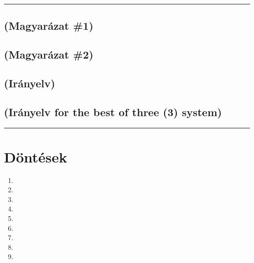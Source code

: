 \documentclass[]{report}
\newenvironment{expl}[0]%
  {\rule{\textwidth}{.2pt}\footnotesize}%
  {\rule{\textwidth}{.2pt}\normalsize}
\begin{document}
\begin{expl}

\section*{(Magyarázat \#1)}

\section*{(Magyarázat \#2)}

\section*{(Irányelv)}

\section*{(Irányelv for the best of three (3) system)}

\end{expl}


\chapter{Döntések}

\begin{enumerate}
\item

\item

\item

\item

\item

\item

\item

\item

\item

\end{enumerate}
\end{document}
